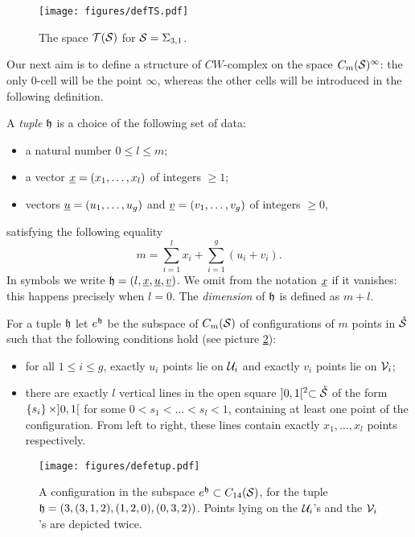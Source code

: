 \begin{figure}\centering
 \texttt{[image: figures/defTS.pdf]}
 \caption{The space $\T(\S)$ for $\S=\Sigma_{3,1}$.}
\label{fig:defTS}
\end{figure}


Our next aim is to define a structure of $CW$-complex on the space $\cms^{\infty}$:
the only $0$-cell will be the point $\infty$, whereas the other cells will be introduced
in the following definition.
\begin{defn}
\label{defn:ehopen}
A \emph{tuple} $\tup$ is a choice of the following set of data:
 \begin{itemize}
  \item a natural number $0\leq l\leq m$;
  \item a vector $\ux=(x_1,\dots, x_l)$ of integers $\geq 1$;
  \item vectors $\uu=(u_1,\dots,u_g)$ and $\uv=(v_1,\dots,v_g)$ of integers $\geq 0$,
 \end{itemize}
satisfying the following equality
\[
 m=\sum_{i=1}^lx_i+\sum_{i=1}^g(u_i+v_i).
\]
In symbols we write $\tup=(l,\ux,\uu,\uv)$. We omit from the notation $\ux$ if it vanishes: this happens precisely when $l=0$.
The \emph{dimension} of $\tup$ is defined as $m+l$.

For a tuple $\tup$ let $e^{\tup}$ be the subspace
of $\cms$ of configurations of $m$ points in $\mrS$ such that the following conditions hold
(see picture \ref{fig:defetup}):
\begin{itemize}
 \item for all $1\leq i\leq g$, exactly $u_i$ points lie on $\U_i$
 and exactly $v_i$ points lie on $\V_i$;
 \item there are exactly $l$ vertical lines in the open square $]0,1[^2\subset\mrS$ of the
 form $\set{s_i}\times]0,1[$ for some $0<s_1<\dots<s_l<1$, containing at least one
 point of the configuration. From left to right, these lines contain exactly $x_1,\dots,x_l$ points
 respectively.
\end{itemize}
\end{defn}


\begin{figure}\centering
 \texttt{[image: figures/defetup.pdf]}
 \caption{A configuration in the subspace $e^{\tup}\subset C_{14}(\S)$, for the tuple $\tup=(3,(3,1,2),(1,2,0),(0,3,2))$. Points
 lying on the $\U_i$'s and the $\V_i$'s are depicted twice.}
\label{fig:defetup}
\end{figure}


